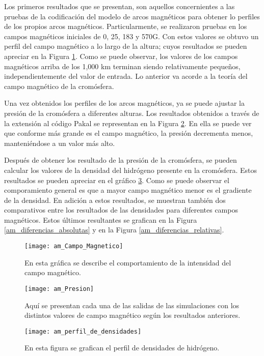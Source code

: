 Los primeros resultados que se presentan, son aquellos concernientes a las pruebas de la codificaci\'on del modelo de arcos magn\'eticos para obtener lo perfiles de los propios arcos magn\'eticos. Particularmente, se realizaron pruebas en los campos magn\'eticos iniciales de 0, 25, 183 y 570G. Con estos valores se obtuvo un perfil del campo magn\'etico a lo largo de la altura; cuyos resultados se pueden apreciar en la Figura \ref{am_Campo_Magnetico}. Como se puede observar, los valores de los campos magn\'eticos arriba de los 1,000 km terminan siendo relativamente peque\~nos, independientemente del valor de entrada. Lo anterior va acorde a la teor\'ia del campo magn\'etico de la crom\'osfera.

Una vez obtenidos los perfiles de los arcos magn\'eticos, ya se puede ajustar la presi\'on de la crom\'osfera a diferentes alturas. Los resultados obtenidos a trav\'es de la extensi\'on al c\'odigo Pakal se representan en la Figura \ref{am_Presion}. En ella se puede ver que conforme m\'as grande es el campo magn\'etico, la presi\'on decrementa menos, manteni\'endose a un valor m\'as alto. 

Despu\'es de obtener los resultado de la presi\'on de la crom\'osfera, se pueden calcular los valores de la densidad del hidr\'ogeno presente en la crom\'osfera. Estos resultados se pueden apreciar en el gr\'afico \ref{am_perfil_de_densidades}. Como se puede observar el comporamiento general es que a mayor campo magn\'etico menor es el gradiente de la densidad. En adici\'on a estos resultados, se muestran tambi\'en dos comparativos entre los resultados de las densidades para diferentes campos magn\'eticos. Estos \'ultimos resultantes se grafican en la Figura \ref{am_diferencias_absolutas} y en la Figura \ref{am_diferencias_relativas}.

\newpage
\begin{figure}[h]
\centering
\texttt{[image: am\_Campo\_Magnetico]}
\caption{ En esta gr\'afica se describe el comportamiento de la intensidad del campo magn\'etico. }
\label{am_Campo_Magnetico}
\end{figure}


\begin{figure}[h]
\centering
\texttt{[image: am\_Presion]}
\caption{ Aqu\'i se presentan cada una de las salidas de las simulaciones con los distintos valores de campo magn\'etico seg\'un los resultados anteriores.}
\label{am_Presion}
\end{figure}

\begin{figure}[h]
\centering
\texttt{[image: am\_perfil\_de\_densidades]}
\caption{ En esta figura se grafican el perfil de densidades de hidr\'ogeno.}
\label{am_perfil_de_densidades}
\end{figure}

